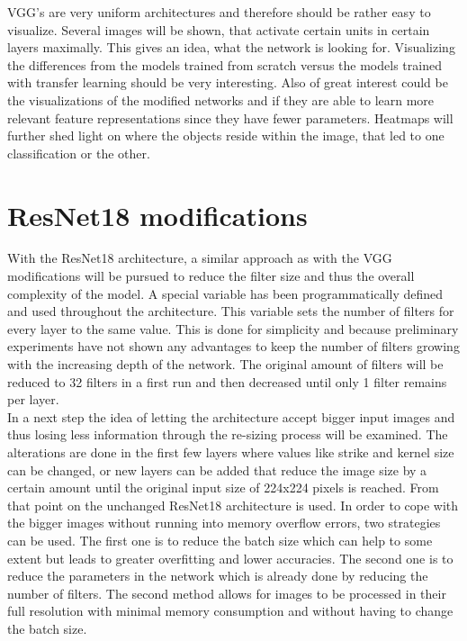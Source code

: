 VGG's are very uniform architectures and therefore should be rather easy to visualize. Several images will be shown, that activate certain units in certain layers maximally. This gives an idea, what the network is looking for. Visualizing the differences from the models trained from scratch versus the models trained with transfer learning should be very interesting. Also of great interest could be the visualizations of the modified networks and if they are able to learn more relevant feature representations since they have fewer parameters. Heatmaps will further shed light on where the objects reside within the  image, that led to one classification or the other. \\


\section{ResNet18 modifications}

With the ResNet18 architecture, a similar approach as with the VGG modifications will be pursued to reduce the filter size and thus the overall complexity of the model. A special variable has been programmatically defined and used throughout the architecture. This variable sets the number of filters for every layer to the same value. This is done for simplicity and because preliminary  experiments  have not shown any advantages to keep the number of filters growing with the increasing depth of the network. The original amount of filters will be reduced to 32 filters in a first run and then decreased until only 1 filter remains per layer. \\

In a next step the idea of letting the architecture accept bigger input images and thus losing less information through the re-sizing process will be examined. The alterations are done in the first few layers where values like strike and kernel size can be changed, or new layers can be added that reduce the image size by a certain amount until the original input size of 224x224 pixels is reached. From that point on the unchanged ResNet18 architecture is used. In order to cope with the bigger images without running into memory overflow errors, two strategies can be used.  The  first one is  to reduce the batch size which can  help to some extent but leads to greater overfitting and lower accuracies. The second one is to reduce the  parameters in  the network which is already done by reducing the number of filters. The second method allows for images to be processed in their full resolution with minimal memory consumption and without having to change the batch size.\\


